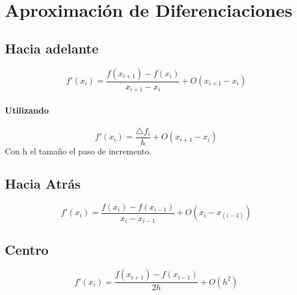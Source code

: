 \section{Aproximación de Diferenciaciones}
\subsection{Hacia adelante}
 $$
  f'(x_i) = \frac {f(x_{i+1}) - f(x_i)} {x_{i+1} -x_i} + O(x_{i+1} -x_i)
 $$
 \paragraph{Utilizando}
 $$
 	 f'(x_i) = \frac{\triangle f_i}{h} +  O(x_{i+1} -x_i)
 $$ Con h el tamaño el paso de incremento.
\subsection{Hacia Atrás}
$$
  f'(x_i) = \frac {f(x_{i}) - f(x_{i-1})} {x_{i} -x_{i-1}} + O(x_{i} -x_(i-1))
 $$
\subsection{Centro}
$$
 f'(x_i) = \frac {f(x_{i+1}) - f(x_{i-1})} {2h} + O(h^2)
$$